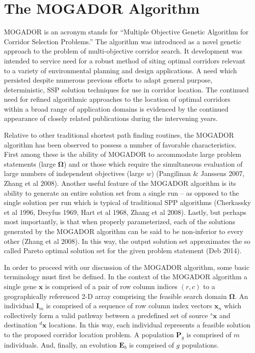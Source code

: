 \section{The MOGADOR Algorithm}
            
MOGADOR is an acronym stands for “Multiple Objective Genetic Algorithm for Corridor Selection Problems.” \cite{Zhang2008} The algorithm was introduced as a novel genetic approach to the problem of multi-objective corridor search. \cite{Mooney2006, Zhang2008} It development was intended to service need for a robust method of siting optimal corridors relevant to a variety of environmental planning and design applications. \cite{Bennett2004, Chakhar2003, Zhou1996} A need which persisted despite numerous previous efforts to adapt general purpose, deterministic, SSP solution techniques for use in corridor location. \cite{Hallam2001, Jankowski1995, Lombard1993} The continued need for refined algorithmic approaches to the location of optimal corridors within a broad range of application domains is evidenced by the continued appearance of closely related publications during the intervening years. \cite{Aissi2012, Mousseau2010, Neema2010, Roberts2010, Scaparra2014, Tsai2011} 

Relative to other traditional shortest path finding routines, the MOGADOR algorithm has been observed to possess a number of favorable characteristics. First among these is the ability of MOGADOR to accommodate large problem statements (large $\boldsymbol{\Omega}$) and or those which require the simultaneous evaluation of large numbers of independent objectives (large $w$) (Pangilinan \& Janssens 2007, Zhang et al 2008). Another useful feature of the MOGADOR algorithm is its ability to generate an entire solution set from a single run – as opposed to the single solution per run which is typical of traditional SPP algorithms (Cherkassky et al 1996, Dreyfus 1969, Hart et al 1968, Zhang et al 2008). Lastly, but perhaps most importantly, is that when properly parameterized, each of the solutions generated by the MOGADOR algorithm can be said to be non-inferior to every other (Zhang et al 2008). In this way, the output solution set approximates the so called Pareto optimal solution set for the given problem statement (Deb 2014).  

In order to proceed with our discussion of the MOGADOR algorithm, some basic terminology must first be defined. In the context of the MOGADOR algorithm a single gene $\textbf{x}$ is comprised of a pair of row column indices $(r,c)$ to a geographically referenced 2-D array comprising the feasible search domain $\boldsymbol{\Omega}$. An individual $\textbf{I}_m$ is comprised of a sequence of row column index vectors $\textbf{x}_n$ which collectively form a valid pathway between a predefined set of source ${}^{s}\textbf{x}$ and destination ${}^{d}\textbf{x}$ locations. In this way, each individual represents a feasible solution to the proposed corridor location problem. A population $\textbf{P}_g$ is comprised of $m$ individuals. And, finally, an evolution $\textbf{E}_b$ is comprised of $g$ populations.

